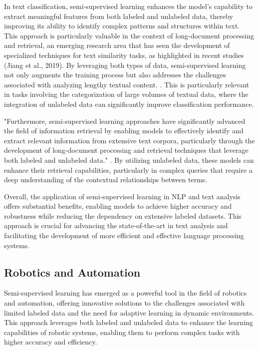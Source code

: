 In text classification, semi-supervised learning enhances the model's capability to extract meaningful features from both labeled and unlabeled data, thereby improving its ability to identify complex patterns and structures within text. This approach is particularly valuable in the context of long-document processing and retrieval, an emerging research area that has seen the development of specialized techniques for text similarity tasks, as highlighted in recent studies (Jiang et al., 2019). By leveraging both types of data, semi-supervised learning not only augments the training process but also addresses the challenges associated with analyzing lengthy textual content. \cite{ginzburg2021selfsuperviseddocumentsimilarityranking}. This is particularly relevant in tasks involving the categorization of large volumes of textual data, where the integration of unlabeled data can significantly improve classification performance.



"Furthermore, semi-supervised learning approaches have significantly advanced the field of information retrieval by enabling models to effectively identify and extract relevant information from extensive text corpora, particularly through the development of long-document processing and retrieval techniques that leverage both labeled and unlabeled data." \cite{ginzburg2021selfsuperviseddocumentsimilarityranking}. By utilizing unlabeled data, these models can enhance their retrieval capabilities, particularly in complex queries that require a deep understanding of the contextual relationships between terms.



Overall, the application of semi-supervised learning in NLP and text analysis offers substantial benefits, enabling models to achieve higher accuracy and robustness while reducing the dependency on extensive labeled datasets. This approach is crucial for advancing the state-of-the-art in text analysis and facilitating the development of more efficient and effective language processing systems.



\subsection{Robotics and Automation} \label{subsec:Robotics and Automation}

Semi-supervised learning has emerged as a powerful tool in the field of robotics and automation, offering innovative solutions to the challenges associated with limited labeled data and the need for adaptive learning in dynamic environments. This approach leverages both labeled and unlabeled data to enhance the learning capabilities of robotic systems, enabling them to perform complex tasks with higher accuracy and efficiency.




